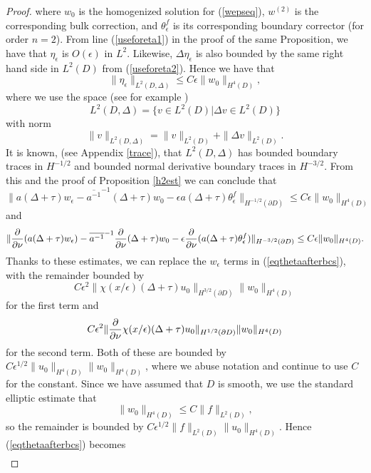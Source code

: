 \documentclass[12pt]{article}
\begin{document}
\begin{proof}
where $w_0$ is the homogenized solution for (\ref{wepseq}), $w^{(2)}$ is the corresponding bulk correction, and $\theta^f_\epsilon$ is its corresponding boundary corrector (for order $n=2$). 
From line (\ref{useforeta1}) in the proof of the same Proposition, we have that $\eta_\epsilon$ is $O(\epsilon)$ in $L^2$. Likewise, $ \Delta \eta_\epsilon $  is also  bounded by the same right hand side in $L^2(D)$ from (\ref{useforeta2}).  Hence we have that 
$$ \|  \eta_\epsilon \|_{L^2(D,\Delta)} \leq  C\epsilon \| w_0\|_{H^4( D)}, $$
where we use the space (see for example \cite{Va})  $$L^2(D, \Delta) = \{ v \in L^2(D)| \Delta v\in L^2(D)\}  $$ with norm $$ \| v\|_{L^2(D,\Delta)} = \|v\|_{L^2(D)} + \| \Delta v \|_{L^2(D)}.$$ It is known, (see Appendix \ref{trace}), that $L^2(D,\Delta)$ has bounded boundary traces in $H^{-1/2}$ and bounded normal derivative boundary traces in $H^{-3/2}$. From this and the proof of Proposition \ref{h2est} we can conclude that 
\begin{equation}\label{hminushalfest} \|a (\Delta+\tau)w_\epsilon -\overline{a^{-1}}^{-1}(\Delta +\tau)w_0 -\epsilon a (\Delta+\tau)\theta^f_\epsilon \|_{H^{-1/2}(\partial D)} \leq C\epsilon \| w_0\|_{H^4( D)} \end{equation} and 
\begin{equation}\label{hminus3halfest} \| {\partial\over{\partial\nu}} (a(\Delta+\tau)w_\epsilon) -\overline{a^{-1}}^{-1}{\partial\over{\partial\nu}}(\Delta +\tau)w_0 -\epsilon {\partial\over{\partial\nu}} (a (\Delta+\tau)\theta^f_\epsilon) \|_{H^{-3/2}(\partial D)} \leq C\epsilon \| w_0\|_{H^4( D)}. \end{equation}
Thanks to these estimates, we can replace the $w_\epsilon$ terms in (\ref{eqthetaafterbcs}), with the remainder bounded by $$C \epsilon^2 \| \chi(x/\epsilon)(\Delta + \tau) u_0 \|_{H^{3/2}(\partial D)}   \| w_0\|_{H^4(D)}$$ for the first term and  $$ C \epsilon^2 \| {\partial\over{\partial\nu}}\chi(x/\epsilon)(\Delta + \tau) u_0 \|_{H^{1/2}(\partial D)}  \| w_0\|_{H^4(D)} $$  for the second term. Both of these are bounded by $ C\epsilon^{1/2} \| u_0\|_{H^4(D)} \| w_0\|_{H^4(D)}$, where we abuse notation and continue to use $C$ for the constant.  Since we have assumed that $D$ is smooth, we use the standard elliptic estimate that $$\| w_0\|_{H^4(D)}\leq C \| f \|_{L^2(D)},$$ so the remainder  is bounded by $C\epsilon^{1/2}\| f \|_{L^2(D)} \| u_0\| _{H^4(D)}$. Hence (\ref{eqthetaafterbcs}) becomes 
\begin{multline}\label{eqthetaafterreplacement}

\end{multline}
\end{proof}
\end{document}

